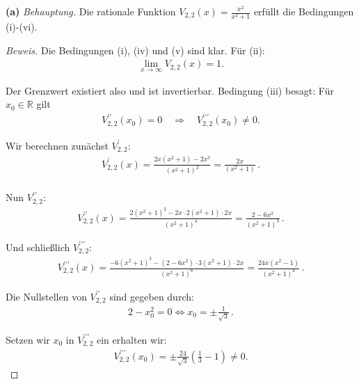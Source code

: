 \documentclass[a4paper]{article}
\newcommand{\R}{\mathbb{R}}
\newcommand{\beh}{\textit{Behauptung. }}
\begin{document}
\textbf{(a)} \beh Die rationale Funktion $V_{2,2}(x) = \frac{x^2}{x^2 + 1}$ erfüllt die Bedingungen (i)-(vi).
\begin{proof}[Beweis]
    Die Bedingungen (i), (iv) und (v) sind klar. Für (ii): 
    \begin{align*}
        \lim_{x\to\infty} V_{2,2}(x) = 1. 
    \end{align*}

    Der Grenzwert existiert also und ist invertierbar. 
    Bedingung (iii) besagt: Für $x_0\in\R$ gilt
    \begin{align*}
        V_{2,2}^{\prime\prime}(x_0) = 0 \quad\Longrightarrow\quad V_{2,2}^{\prime\prime\prime}(x_0) \neq 0.
    \end{align*}

    Wir berechnen zunächst $V_{2,2}^{\prime}$: 
    \begin{align*}
        V_{2,2}^{\prime}(x) = \frac{2x(x^2+1)-2x^3}{(x^2+1)^2} = \frac{2x}{(x^2+1)} \,. \\
    \end{align*}

    Nun $V_{2,2}^{\prime\prime}$:
    \begin{align*}
        V_{2,2}^{\prime\prime}(x) = \frac{2(x^2+1)^2 - 2x\cdot 2 (x^2+1)\cdot 2x}{(x^2+1)^4} 
                                  = \frac{2-6x^2}{(x^2+1)^3} \,. 
    \end{align*}
    
    Und schließlich $V_{2,2}^{\prime\prime\prime}$:
    \begin{align*}
        V_{2,2}^{\prime\prime\prime}(x) = \frac{-6(x^2+1)^3 - (2-6x^2)\cdot 3(x^2 + 1)\cdot 2x}{(x^2+1)^6} 
                                        = \frac{24x(x^2-1)}{(x^2+1)^4} \,.
    \end{align*}

    Die Nullstellen von $V_{2,2}^{\prime\prime}$ sind gegeben durch:
    \begin{align*}
        2 - x_0^2 = 0 \Longleftrightarrow x_0 = \pm\frac{1}{\sqrt{3}} \,.
    \end{align*}

    Setzen wir $x_0$ in $V_{2,2}^{\prime\prime\prime}$ ein erhalten wir:
    \begin{align*}
        V_{2,2}^{\prime\prime\prime}(x_0) = \pm \frac{24}{\sqrt{3}}\left(\frac{1}{3} - 1\right) \neq 0.
    \end{align*}


\end{proof}
\end{document}
